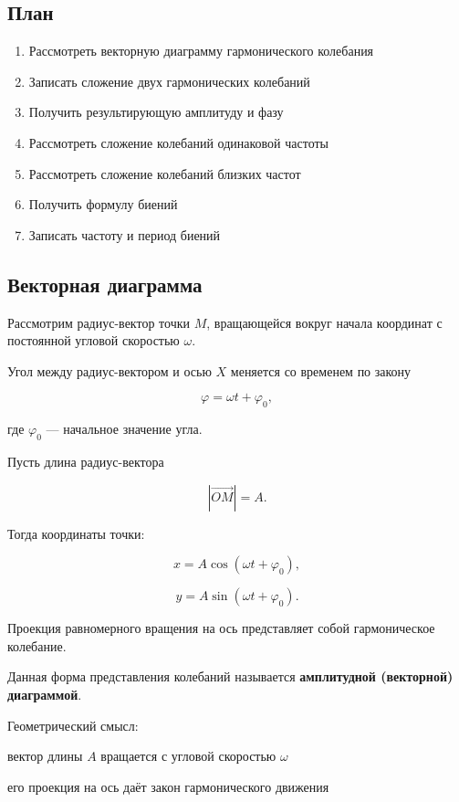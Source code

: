 \documentclass[a4paper,12pt]{article}
\begin{document}
\subsection*{План}
\begin{enumerate}
\item Рассмотреть векторную диаграмму гармонического колебания
\item Записать сложение двух гармонических колебаний
\item Получить результирующую амплитуду и фазу
\item Рассмотреть сложение колебаний одинаковой частоты
\item Рассмотреть сложение колебаний близких частот
\item Получить формулу биений
\item Записать частоту и период биений
\end{enumerate}

\subsection*{Векторная диаграмма}

Рассмотрим радиус-вектор точки $M$, вращающейся вокруг начала координат с постоянной угловой скоростью $\omega$.

Угол между радиус-вектором и осью $X$ меняется со временем по закону

\[
\varphi = \omega t + \varphi_0,
\]

где $\varphi_0$ — начальное значение угла.

Пусть длина радиус-вектора

\[
|\vec{OM}| = A.
\]

Тогда координаты точки:

\[
x = A \cos(\omega t + \varphi_0),
\]

\[
y = A \sin(\omega t + \varphi_0).
\]

\begin{theorembox}
Проекция равномерного вращения на ось представляет собой гармоническое колебание.
\end{theorembox}

Данная форма представления колебаний называется \textbf{амплитудной (векторной) диаграммой}.

Геометрический смысл:

вектор длины $A$ вращается с угловой скоростью $\omega$

его проекция на ось даёт закон гармонического движения
\end{document}
